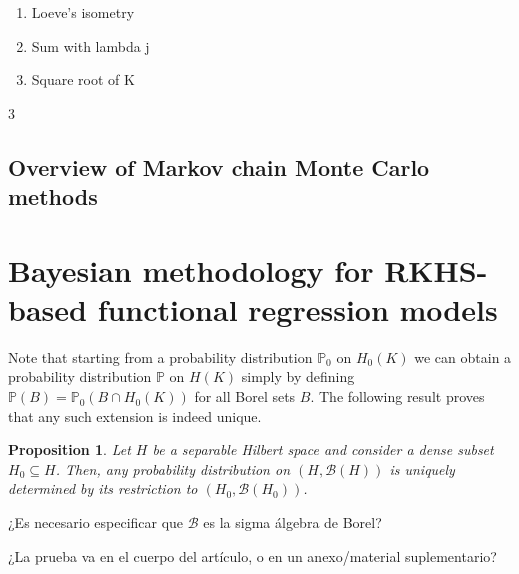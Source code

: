 \documentclass[ba]{imsart}
\numberwithin{equation}{section}
\theoremstyle{plain}
\newtheorem{prop}{Proposition}[section]
\newenvironment{comment}
{
\noindent \em \color{red}
}
{
\color{black}
}
\begin{document}
\begin{enumerate}
  \item Loeve's isometry
  \item Sum with lambda j
  \item Square root of K

\end{enumerate}3

\subsection{Overview of Markov chain Monte Carlo methods}

\section{Bayesian methodology for RKHS-based functional regression models}

Note that starting from a probability distribution \(\mathbb{P}_0\) on \(H_0(K)\) we can obtain a probability distribution \(\mathbb{P}\) on \(H(K)\) simply by defining \(\mathbb{P}(B) = \mathbb{P}_0(B\cap H_0(K))\) for all Borel sets \(B\). The following result proves that any such extension is indeed unique.

\begin{prop} Let \(H\) be a separable Hilbert space and consider a dense subset \(H_0\subseteq H\). Then, any probability distribution on \((H, \mathcal{B}(H))\) is uniquely determined by its restriction to \((H_0, \mathcal B(H_0))\).
\end{prop}

\begin{comment}
  ¿Es necesario especificar que \(\mathcal B\) es la sigma álgebra de Borel?
\end{comment}

\begin{comment}
    ¿La prueba va en el cuerpo del artículo, o en un anexo/material suplementario?
\end{comment}
\end{document}
